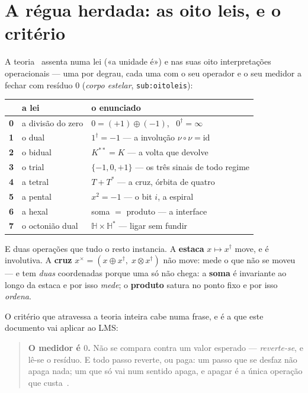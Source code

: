 \documentclass[11pt,a4paper]{article}
\newcommand{\code}[1]{\texttt{\small #1}}
\newcommand{\dg}{^{\dagger}}
\begin{document}
\tableofcontents

\section{A régua herdada: as oito leis, e o critério}\label{sec:regua}

A teoria~\cite{teoria,estelar} assenta numa lei («a unidade é») e nas suas oito interpretações
operacionais --- uma por degrau, cada uma com o seu operador e o seu medidor a fechar com resíduo $0$
(\emph{corpo estelar}, \code{sub:oitoleis}):

\begin{center}\small
\begin{tabular}{@{}cll@{}}
\toprule
 & a lei & o enunciado \\
\midrule
\textbf{0} & a divisão do zero & $0=(+1)\oplus(-1)$, \ $0\dg=\infty$ \\
\textbf{1} & o dual & $1\dg=-1$ --- a involução $\nu\circ\nu=\mathrm{id}$ \\
\textbf{2} & o bidual & $K^{**}=K$ --- a volta que devolve \\
\textbf{3} & o trial & $\{-1,0,+1\}$ --- os três sinais de todo regime \\
\textbf{4} & a tetral & $T+T^{*}$ --- a cruz, órbita de quatro \\
\textbf{5} & a pental & $x^{2}=-1$ --- o bit $i$, a espiral \\
\textbf{6} & a hexal & soma $=$ produto --- a interface \\
\textbf{7} & o octonião dual & $\mathbb{H}\times\mathbb{H}^{*}$ --- ligar sem fundir \\
\bottomrule
\end{tabular}
\end{center}

\noindent E duas operações que tudo o resto instancia. A \textbf{estaca} $x\mapsto x\dg$ move, e é
involutiva. A \textbf{cruz} $x^{\times}=(x\oplus x\dg,\;x\otimes x\dg)$ não move: mede o que não se
moveu --- e tem \emph{duas} coordenadas porque uma só não chega: a \textbf{soma} é invariante ao longo
da estaca e por isso \emph{mede}; o \textbf{produto} satura no ponto fixo e por isso \emph{ordena}.

\smallskip
\noindent O critério que atravessa a teoria inteira cabe numa frase, e é a que este documento vai
aplicar ao LMS:

\begin{quote}
\textbf{O medidor é $0$.} Não se compara contra um valor esperado --- \emph{reverte-se}, e lê-se o
resíduo. E todo passo reverte, ou paga: um passo que se desfaz não apaga nada; um que só vai num
sentido apaga, e apagar é a única operação que custa~\cite{arquitetura}.
\end{quote}
\end{document}
